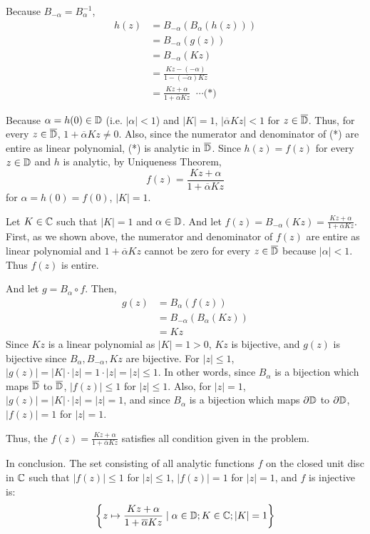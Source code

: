 Because \(B_{-\alpha} = B_{\alpha}^{-1}\),
\begin{align*}
  h(z)
  &= B_{-\alpha}(B_\alpha(h(z)))
  \\&= B_{-\alpha}(g(z))
  \\&= B_{-\alpha}(Kz)
  \\&= \frac{Kz - (-\alpha)}{1 - (\overline{-\alpha})Kz}
  \\&= \frac{Kz + \alpha}{1 + \overline{\alpha}Kz} \;\;\cdots\text{(*)}
\end{align*}

Because \(\alpha = h(0) \in \mathbb{D}\) (i.e. \(|\alpha| < 1\)) and \(|K| = 1\),
\(|\overline{\alpha}Kz| < 1\) for \(z \in \overline{\mathbb{D}}\).
Thus, for every \(z \in \overline{\mathbb{D}}\), \(1 + \overline{\alpha}Kz \neq 0\).
Also, since the numerator and denominator of (*) are entire as linear polynomial, (*) is analytic in \(\overline{\mathbb{D}}\).
Since \(h(z) = f(z)\) for every \(z \in \mathbb{D}\) and \(h\) is analytic,
by Uniqueness Theorem,
\[f(z) = \frac{Kz + \alpha}{1 + \overline{\alpha}Kz}\]
for \(\alpha = h(0) = f(0)\), \(|K| = 1\).
\newline

Let \(K \in \mathbb{C}\) such that \(|K| = 1\) and \(\alpha \in \mathbb{D}\).
And let \(f(z) = B_{-\alpha}(Kz) = \frac{Kz + \alpha}{1 + \overline{\alpha}Kz}\).
First, as we shown above, the numerator and denominator of \(f(z)\) are entire as linear polynomial and \(1 + \overline{\alpha}Kz\) cannot be zero for every \(z \in \overline{\mathbb{D}}\) because \(|\alpha| < 1\).
Thus \(f(z)\) is entire.

And let \(g = B_\alpha \circ f\). Then,
\begin{align*}
  g(z)
  &= B_{\alpha}(f(z))
  \\&= B_{-\alpha}(B_{\alpha}(Kz))
  \\&= Kz
\end{align*}
Since \(Kz\) is a linear polynomial as \(|K| = 1 > 0\), \(Kz\) is bijective, and \(g(z)\) is bijective since \(B_\alpha, B_{-\alpha}, Kz\) are bijective.
For \(|z| \le 1\), \(|g(z)| = |K|\cdot |z| = 1 \cdot |z| = |z| \le 1\).
In other words, since \(B_{\alpha}\) is a bijection which maps \(\overline{\mathbb{D}}\) to \(\overline{\mathbb{D}}\),
\(|f(z)| \le 1\) for \(|z| \le 1\).
Also, for \(|z| = 1\), \(|g(z)| = |K|\cdot |z| = |z| = 1\),
and since \(B_{\alpha}\) is a bijection which maps \(\partial\mathbb{D}\) to \(\partial\mathbb{D}\), 
\(|f(z)| = 1\) for \(|z| = 1\).

Thus, the \(f(z) = \frac{Kz + \alpha}{1 + \overline{\alpha}Kz}\) satisfies all condition given in the problem.
\newline

\noindent
In conclusion. The set consisting of all analytic functions \(f\) on the closed unit disc in \(\mathbb{C}\) such that \(|f(z)| \le 1\) for \(|z| \le 1\), \(|f(z)| = 1\) for \(|z| = 1\), and \(f\) is injective is:
\[\left\{z \mapsto \frac{Kz + \alpha}{1 + \overline{\alpha}Kz}
  \mid
  \alpha \in \mathbb{D};
  K \in \mathbb{C};
  |K| = 1
  \right\}\]
\qedsq